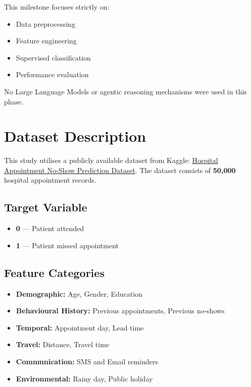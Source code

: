 \documentclass[12pt, a4paper]{report}
\begin{document}
\noindent This milestone focuses strictly on:
\begin{itemize}
  \item Data preprocessing
  \item Feature engineering
  \item Supervised classification
  \item Performance evaluation
\end{itemize}

\noindent No Large Language Models or agentic reasoning mechanisms were used in
this phase.

\section{Dataset Description}

This study utilises a publicly available dataset from Kaggle:
\href{https://www.kaggle.com/datasets/miadul/hospital-appointment-no-show-prediction-dataset}%
{Hospital Appointment No-Show Prediction Dataset}.
The dataset consists of \textbf{50{,}000} hospital appointment records.

\subsection*{Target Variable}
\begin{itemize}
  \item \textbf{0} --- Patient attended
  \item \textbf{1} --- Patient missed appointment
\end{itemize}

\subsection*{Feature Categories}
\begin{itemize}
  \item \textbf{Demographic:} Age, Gender, Education
  \item \textbf{Behavioural History:} Previous appointments, Previous no-shows
  \item \textbf{Temporal:} Appointment day, Lead time
  \item \textbf{Travel:} Distance, Travel time
  \item \textbf{Communication:} SMS and Email reminders
  \item \textbf{Environmental:} Rainy day, Public holiday
\end{itemize}
\end{document}

